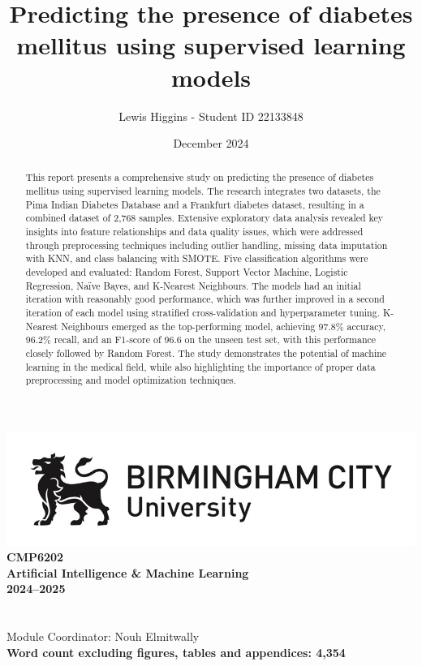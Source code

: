 \documentclass[12pt]{report}
\title{Predicting the presence of diabetes mellitus using supervised learning models}
\author{Lewis Higgins - Student ID 22133848}
\date{December 2024}
\begin{document}
\makeatletter
\begin{titlepage}
    \begin{center}
        \includegraphics[width=.8\linewidth]{BCU-Long.jpg}\\[4ex]
        {\huge \bfseries CMP6202}\\[4ex]
        {\huge \bfseries Artificial Intelligence \& Machine Learning}\\[4ex]
        {\huge \bfseries 2024–2025}\\[16ex]
        {\huge \bfseries  \@title}\\[35ex]
        {\@author}\\[2ex]
        {Module Coordinator: Nouh Elmitwally}\\[2ex]
        {\bfseries Word count excluding figures, tables and appendices: 4,354}\\[10ex]
    \end{center}
\end{titlepage}
\makeatother
\thispagestyle{empty}
\newpage


\setcounter{page}{0}


\tableofcontents
\thispagestyle{empty}

\begin{abstract}
    This report presents a comprehensive study on predicting the presence of diabetes mellitus using supervised learning models. 
    The research integrates two datasets, the Pima Indian Diabetes Database and a Frankfurt diabetes dataset, resulting in a combined dataset of
    2,768 samples. Extensive exploratory data analysis revealed key insights into feature relationships and data quality issues, which were 
    addressed through preprocessing techniques including outlier handling, missing data imputation with KNN, and class balancing with SMOTE. 
    Five classification algorithms were developed and evaluated: Random Forest, Support Vector Machine, Logistic Regression, Naïve Bayes, and K-Nearest Neighbours.
    The models had an initial iteration with reasonably good performance, which was further improved in a second iteration of each model using stratified cross-validation
    and hyperparameter tuning. K-Nearest Neighbours emerged as the top-performing model, achieving 97.8\% accuracy, 96.2\% recall, and an F1-score of 96.6 on the unseen test set,
    with this performance closely followed by Random Forest. The study demonstrates the potential of machine learning in the medical field, while also highlighting the 
    importance of proper data preprocessing and model optimization techniques. 
\end{abstract}
\end{document}
